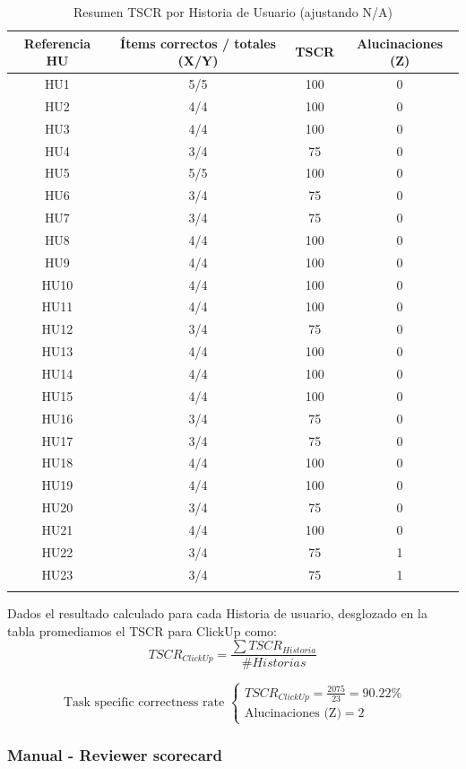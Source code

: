 \begin{longtable}{|c|c|c|c|}
\hline
\textbf{Referencia HU} & \textbf{Ítems correctos / totales (X/Y)} & \textbf{TSCR} & \textbf{Alucinaciones (Z)} \\
\hline
HU1 & 5/5 & 100 & 0 \\
\hline
HU2 & 4/4 & 100 & 0 \\
\hline
HU3 & 4/4 & 100 & 0 \\
\hline
HU4 & 3/4 & 75 & 0 \\
\hline
HU5 & 5/5 & 100 & 0 \\
\hline
HU6 & 3/4 & 75 & 0 \\
\hline
HU7 & 3/4 & 75 & 0 \\
\hline
HU8 & 4/4 & 100 & 0 \\
\hline
HU9 & 4/4 & 100 & 0 \\
\hline
HU10 & 4/4 & 100 & 0 \\
\hline
HU11 & 4/4 & 100 & 0 \\
\hline
HU12 & 3/4 & 75 & 0 \\
\hline
HU13 & 4/4 & 100 & 0 \\
\hline
HU14 & 4/4 & 100 & 0 \\
\hline
HU15 & 4/4 & 100 & 0 \\
\hline
HU16 & 3/4 & 75 & 0 \\
\hline
HU17 & 3/4 & 75 & 0 \\
\hline
HU18 & 4/4 & 100 & 0 \\
\hline
HU19 & 4/4 & 100 & 0 \\
\hline
HU20 & 3/4 & 75 & 0 \\
\hline
HU21 & 4/4 & 100 & 0 \\
\hline
HU22 & 3/4 & 75 & 1 \\
\hline
HU23 & 3/4 & 75 & 1 \\
\hline
\caption{Resumen TSCR por Historia de Usuario (ajustando N/A)}
\end{longtable}

Dados el resultado calculado para cada Historia de usuario, desglozado en la tabla promediamos el TSCR para ClickUp como:
\[
TSCR_{ClickUp} = \frac{\sum TSCR_{Historia}}{\# Historias}
\]

\[
\text{ Task specific correctness rate }
\begin{cases}
TSCR_{ClickUp} = \frac{2075}{23} = 90.22\%
\\
\text{Alucinaciones (Z)} = 2
\end{cases}
\]

\subsubsection{Manual - Reviewer scorecard}

